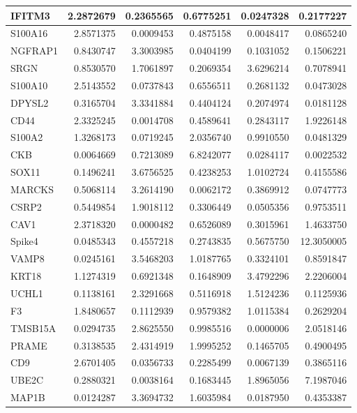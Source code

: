 \documentclass{beamer}\usepackage[]{graphicx}\usepackage[]{color}
\newenvironment{knitrout}{}{} %
\begin{document}
\begin{frame}[fragile]
\begin{knitrout}
\begin{tabular}{l|r|r|r|r|r}
\hline
IFITM3 & 2.2872679 & 0.2365565 & 0.6775251 & 0.0247328 & 0.2177227\\
\hline
S100A16 & 2.8571375 & 0.0009453 & 0.4875158 & 0.0048417 & 0.0865240\\
\hline
NGFRAP1 & 0.8430747 & 3.3003985 & 0.0404199 & 0.1031052 & 0.1506221\\
\hline
SRGN & 0.8530570 & 1.7061897 & 0.2069354 & 3.6296214 & 0.7078941\\
\hline
S100A10 & 2.5143552 & 0.0737843 & 0.6556511 & 0.2681132 & 0.0473028\\
\hline
DPYSL2 & 0.3165704 & 3.3341884 & 0.4404124 & 0.2074974 & 0.0181128\\
\hline
CD44 & 2.3325245 & 0.0014708 & 0.4589641 & 0.2843117 & 1.9226148\\
\hline
S100A2 & 1.3268173 & 0.0719245 & 2.0356740 & 0.9910550 & 0.0481329\\
\hline
CKB & 0.0064669 & 0.7213089 & 6.8242077 & 0.0284117 & 0.0022532\\
\hline
SOX11 & 0.1496241 & 3.6756525 & 0.4238253 & 1.0102724 & 0.4155586\\
\hline
MARCKS & 0.5068114 & 3.2614190 & 0.0062172 & 0.3869912 & 0.0747773\\
\hline
CSRP2 & 0.5449854 & 1.9018112 & 0.3306449 & 0.0505356 & 0.9753511\\
\hline
CAV1 & 2.3718320 & 0.0000482 & 0.6526089 & 0.3015961 & 1.4633750\\
\hline
Spike4 & 0.0485343 & 0.4557218 & 0.2743835 & 0.5675750 & 12.3050005\\
\hline
VAMP8 & 0.0245161 & 3.5468203 & 1.0187765 & 0.3324101 & 0.8591847\\
\hline
KRT18 & 1.1274319 & 0.6921348 & 0.1648909 & 3.4792296 & 2.2206004\\
\hline
UCHL1 & 0.1138161 & 2.3291668 & 0.5116918 & 1.5124236 & 0.1125936\\
\hline
F3 & 1.8480657 & 0.1112939 & 0.9579382 & 1.0115384 & 0.2629204\\
\hline
TMSB15A & 0.0294735 & 2.8625550 & 0.9985516 & 0.0000006 & 2.0518146\\
\hline
PRAME & 0.3138535 & 2.4314919 & 1.9995252 & 0.1465705 & 0.4900495\\
\hline
CD9 & 2.6701405 & 0.0356733 & 0.2285499 & 0.0067139 & 0.3865116\\
\hline
UBE2C & 0.2880321 & 0.0038164 & 0.1683445 & 1.8965056 & 7.1987046\\
\hline
MAP1B & 0.0124287 & 3.3694732 & 1.6035984 & 0.0187950 & 0.4353387\\

\end{tabular}
\end{knitrout}
\end{frame}
\end{document}
